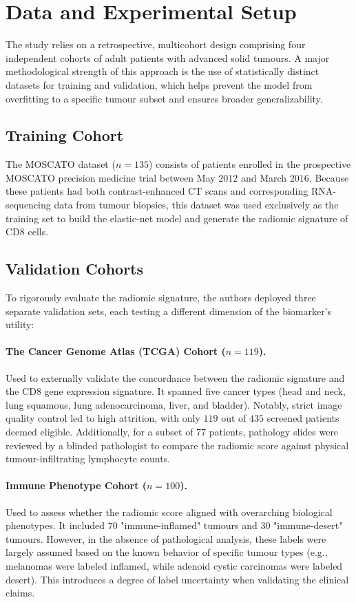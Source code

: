 \documentclass[10pt]{article}
\begin{document}
\section{Data and Experimental Setup}
The study relies on a retrospective, multicohort design comprising four independent cohorts of adult patients with advanced solid tumours. A major methodological strength of this approach is the use of statistically distinct datasets for training and validation, which helps prevent the model from overfitting to a specific tumour subset and ensures broader generalizability.

\subsection{Training Cohort}
The MOSCATO dataset ($n=135$) consists of patients enrolled in the prospective MOSCATO precision medicine trial between May $2012$ and March $2016$. Because these patients had both contrast-enhanced CT scans and corresponding RNA-sequencing data from tumour biopsies, this dataset was used exclusively as the training set to build the elastic-net model and generate the radiomic signature of CD8 cells.

\subsection{Validation Cohorts}
To rigorously evaluate the radiomic signature, the authors deployed three separate validation sets, each testing a different dimension of the biomarker's utility:
\paragraph{The Cancer Genome Atlas (TCGA) Cohort ($n=119$).} Used to externally validate the concordance between the radiomic signature and the CD8 gene expression signature. It spanned five cancer types (head and neck, lung squamous, lung adenocarcinoma, liver, and bladder). Notably, strict image quality control led to high attrition, with only $119$ out of $435$ screened patients deemed eligible. Additionally, for a subset of $77$ patients, pathology slides were reviewed by a blinded pathologist to compare the radiomic score against physical tumour-infiltrating lymphocyte counts.
\paragraph{Immune Phenotype Cohort ($n=100$).} Used to assess whether the radiomic score aligned with overarching biological phenotypes. It included $70$ "immune-inflamed" tumours and $30$ "immune-desert" tumours. However, in the absence of pathological analysis, these labels were largely assumed based on the known behavior of specific tumour types (e.g., melanomas were labeled inflamed, while adenoid cystic carcinomas were labeled desert). This introduces a degree of label uncertainty when validating the clinical claims.
\end{document}
